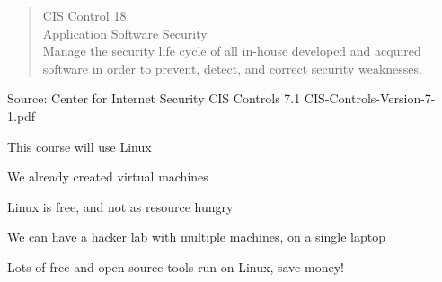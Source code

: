 \documentclass[Screen16to9,17pt]{foils}
\begin{document}

\begin{quote}
CIS Control 18:\\
Application Software Security\\
Manage the security life cycle of all in-house developed and acquired software in order to prevent, detect, and correct security weaknesses.
\end{quote}

\begin{list1}
\item
\item
\item
\item
\end{list1}

Source: Center for Internet Security CIS Controls 7.1 CIS-Controls-Version-7-1.pdf






\begin{list2}
\item This course will use Linux
\item We already created virtual machines
\item Linux is free, and not as resource hungry
\item We can have a hacker lab with multiple machines, on a single laptop
\item Lots of free and open source tools run on Linux, save money!
\end{list2}








\slidenext{}
\end{document}
